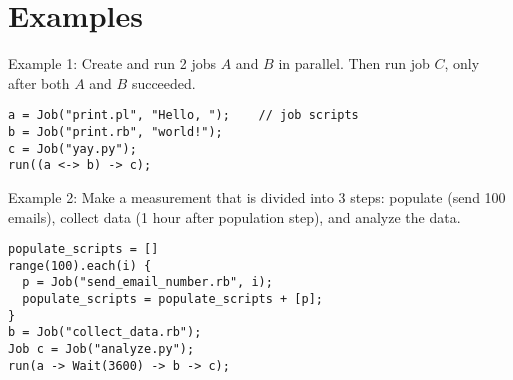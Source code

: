 \section{Examples}
\label{sect:ex}
Example 1: Create and run 2 jobs $A$ and $B$ in parallel.
Then run job $C$, only after both $A$ and $B$ succeeded.
\begin{lstlisting}
a = Job("print.pl", "Hello, ");    // job scripts
b = Job("print.rb", "world!");
c = Job("yay.py");
run((a <-> b) -> c);
\end{lstlisting}
Example 2: Make a measurement that is divided into 3 steps: populate (send 100 emails), collect
data (1 hour after population step), and analyze the data.
\begin{lstlisting}
populate_scripts = []
range(100).each(i) {
  p = Job("send_email_number.rb", i);
  populate_scripts = populate_scripts + [p];
}
b = Job("collect_data.rb");
Job c = Job("analyze.py");
run(a -> Wait(3600) -> b -> c);
\end{lstlisting}

